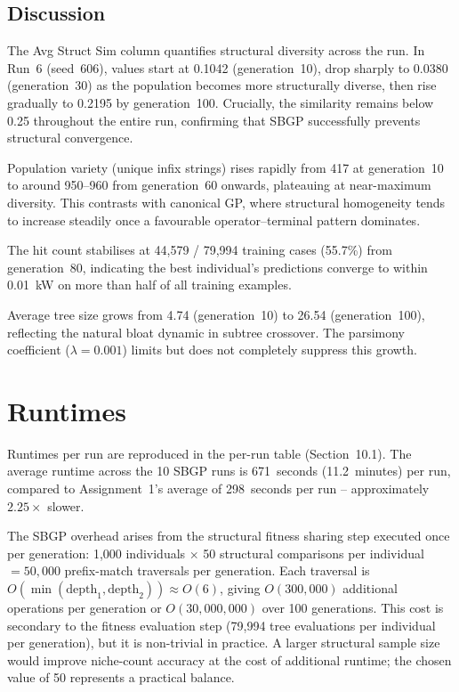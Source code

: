 \documentclass[12pt,a4paper]{article}
\begin{document}
\subsection{Discussion}

The Avg Struct Sim column quantifies structural diversity across the run.
In Run~6 (seed~606), values start at 0.1042 (generation~10), drop sharply to 0.0380
(generation~30) as the population becomes more structurally diverse, then rise gradually to
0.2195 by generation~100. Crucially, the similarity remains below 0.25 throughout
the entire run, confirming that SBGP successfully prevents structural convergence.

Population variety (unique infix strings) rises rapidly from 417 at generation~10 to
around 950--960 from generation~60 onwards, plateauing at near-maximum diversity.
This contrasts with canonical GP, where structural homogeneity tends to increase
steadily once a favourable operator--terminal pattern dominates.

The hit count stabilises at 44,579 / 79,994 training cases (55.7\%) from
generation~80, indicating the best individual's predictions converge to within
0.01~kW on more than half of all training examples.

Average tree size grows from 4.74 (generation~10) to 26.54 (generation~100),
reflecting the natural bloat dynamic in subtree crossover. The parsimony coefficient
($\lambda = 0.001$) limits but does not completely suppress this growth.

\section{Runtimes}

Runtimes per run are reproduced in the per-run table (Section~10.1). The average
runtime across the 10 SBGP runs is 671~seconds (11.2~minutes) per run, compared
to Assignment~1's average of 298~seconds per run -- approximately $2.25\times$ slower.

The SBGP overhead arises from the structural fitness sharing step executed once per
generation: 1,000 individuals $\times$ 50 structural comparisons per individual
$= 50{,}000$ prefix-match traversals per generation. Each traversal is
$O(\min(\text{depth}_1, \text{depth}_2)) \approx O(6)$, giving
$O(300{,}000)$ additional operations per generation or $O(30{,}000{,}000)$ over
100 generations. This cost is secondary to the fitness evaluation step (79,994
tree evaluations per individual per generation), but it is non-trivial in practice.
A larger structural sample size would improve niche-count accuracy at the cost of
additional runtime; the chosen value of 50 represents a practical balance.
\end{document}
